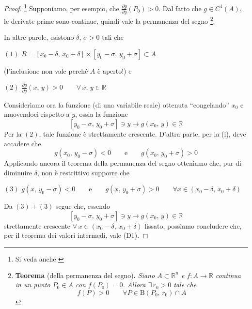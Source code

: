 \begin{proof}\footnote{Si veda anche \cite{Conti1993}}
Supponiamo, per esempio, che $\frac{\partial g}{\partial y} (P_0) > 0$. Dal fatto che $g \in C^1(A)$, le derivate prime sono continue, quindi vale la permanenza del segno \footnote{
\textbf{Teorema }\textnormal{(della permanenza del segno)}\textbf{.}\textit{
Siano $A \subset \mathbb{R}^n$ e $f : A \longrightarrow \mathbb{R}$ continua in un punto $P_0 \in A$ con $f(P_0) = 0$. Allora $\exists \, r_0 > 0$ tale che
$$
f(P) > 0 \qquad \forall P \in \mathrm{B}(P_0,\,r_0) \cap A
$$
}}.
\begin{center}
\def\svgwidth{10cm}

\end{center}
In altre parole, esistono $\delta,\,\sigma > 0$ tali che
\begin{center}
$\mathrm{(1)}$
\hfill
$\displaystyle
R = [x_0 - \delta,\, x_0 + \delta] \times [y_0 - \sigma,\, y_0 + \sigma] \subset A
$
\hfill \null \\
\end{center}
(l'inclusione non vale perché $A$ è aperto!) e
\begin{center}
$\mathrm{(2)}$
\hfill
$\displaystyle
\frac{\partial g}{\partial y}(x,\,y) > 0 \qquad \forall \, x,\,y \in \mathbb{R}
$
\hfill \null \\
\end{center}
Consideriamo ora la funzione (di una variabile reale) ottenuta ``congelando'' $x_0$ e muovendoci rispetto a $y$, ossia la funzione
$$
[y_0-\sigma,\,y_0+\sigma] \ni y \longmapsto g(x_0,\,y) \in \mathbb{R}
$$
Per la $\mathrm{(2)}$, tale funzione è strettamente crescente. D'altra parte, per la (i), deve accadere che
$$
g(x_0,\,y_0-\sigma) < 0 \qquad \text{e} \qquad g(x_0,\,y_0+\sigma) > 0
$$
Applicando ancora il teorema della permanenza del segno otteniamo che, pur di diminuire $\delta$, non è restrittivo supporre che
\begin{center}
$\mathrm{(3)}$
\hfill
$\displaystyle
g(x,\,y_0-\sigma) < 0 \qquad \text{e} \qquad g(x,\,y_0+\sigma) > 0
\qquad \forall x \in (x_0-\delta,\, x_0+\delta)
$
\hfill \null \\
\end{center}
Da $\mathrm{(3)}+\mathrm{(3)}$ segue che, essendo
$$
[y_0-\sigma,\,y_0+\sigma] \ni y \longmapsto g(x_0,\,y) \in \mathbb{R}
$$
strettamente crescente $\forall \, x \in (x_0-\delta,\, x_0+\delta)$ fissato, possiamo concludere che, per il teorema dei valori intermedi, vale (D1).


\end{proof}
